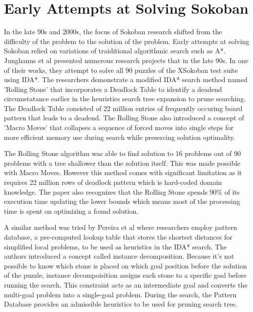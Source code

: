 






\section{Early Attempts at Solving Sokoban}


In the late 90s and 2000s, the focus of Sokoban research shifted from the difficulty of the problem to the solution of the problem. Early attempts at solving Sokoban relied on variations of traiditional algorithmic search such as A*. Junghanns et al presented numerous research projects that in the late 90s. In one of their works, they attempt to solve all 90 puzzles of the XSokoban test suite using IDA*. \cite{myers_xsokoban} \cite{junghanns1997sokoban} \cite{junghanns1998sokoban} The researchers demonstrate a modified IDA* search method named 'Rolling Stone' that incorporates a Deadlock Table to identify a deadend circumstatance earlier in the heuristics search tree expansion to prune searching. The Deadlock Table consisted of 22 million entries of frequently occuring board pattern that leads to a deadend. The Rolling Stone also introduced a concept of 'Macro Moves' that collapses a sequence of forced moves into single steps for more efficient memory use during search while presercing solution optimality. 

The Rolling Stone algorithm was able to find solution to 16 problems out of 90 problems with a tree shallower than the solution itself. This was made possible with Macro Moves. However this method comes with significant limitation as it requires 22 million rows of deadlock pattern which is hard-coded domain knowledge. The paper also recognizes that the Rolling Stone spends 90\% of its execution time updating the lower bounds which means most of the processing time is spent on optimizing a found solution. \cite{junghanns1998sokoban} 

A similar method was tried by Pereira et al \cite{pereira2013finding} where researchers employ pattern database, a pre-computed lookup table that stores the shortest distances for simplified local problems, to be used as heuristics in the IDA* search. The authors introduced a concept called instance decomposition. Because it's not possible to know which stone is placed on which goal position before the solution of the puzzle, instance decompoisition assigns each stone to a specific goal before running the search. This constraint acts as an intermediate goal and converts the multi-goal problem into a single-goal problem. During the search, the Pattern Database provides an admissible heuristics to be used for pruning search tree. 



